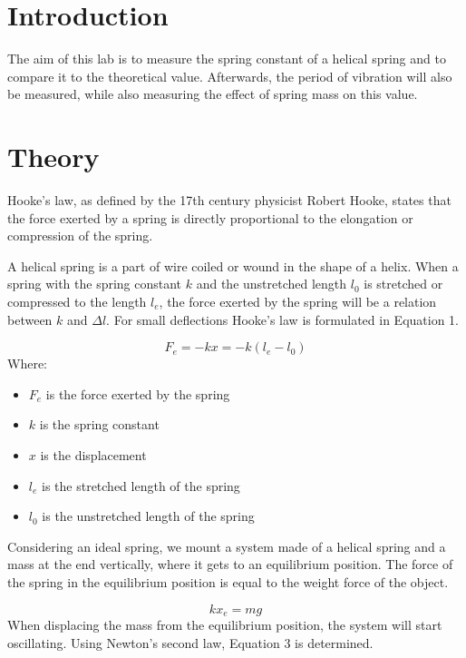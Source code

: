 \documentclass[a4paper, 10pt]{article}
\begin{document}

\begin{justify}
\section{Introduction}
The aim of this lab is to measure the spring constant of a helical spring and to
compare it to the theoretical value. Afterwards, the period of vibration will also be
measured, while also measuring the effect of spring mass on this value.
\section{Theory}
Hooke's law, as defined by the 17th century physicist Robert Hooke, states that
the force exerted by a spring is directly proportional to the elongation or
compression of the spring\cite{williams_what_nodate}.
\par
A helical spring is a part of wire coiled or wound in the shape of a helix. When
a spring with the spring constant $k$ and the unstretched length $l_0$ is
stretched or compressed to the length $l_e$, the force exerted by the spring
will be a relation between $k$ and $\Delta l$. For small deflections Hooke's law
is formulated in Equation 1\cite{williams_what_nodate}.
\par
\begin{equation}
    F_e = -kx = -k(l_e - l_0)
\end{equation}
Where:
\begin{itemize}
    \item $F_e$ is the force exerted by the spring
    \item $k$ is the spring constant
    \item $x$ is the displacement
    \item $l_e$ is the stretched length of the spring
    \item $l_0$ is the unstretched length of the spring
\end{itemize}
Considering an ideal spring, we mount a system made of a helical spring and a
mass at the end vertically, where it gets to an equilibrium position. The force
of the spring in the equilibrium position is equal to the weight force of the
object.
\par
\begin{equation}  \label{eq:2}
    k x_e = mg 
\end{equation}
When displacing the mass from the equilibrium position, the system will start
oscillating.
Using Newton's second law, Equation 3 is determined.

\end{justify}
\end{document}
